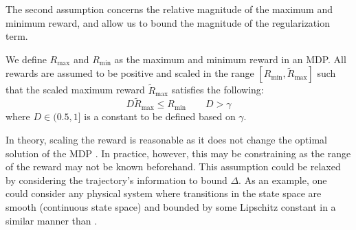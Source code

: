 The second assumption concerns the relative magnitude of the maximum and minimum reward, and allow us to bound the magnitude of the regularization term. 
\begin{assumption}
\label{assumption_rew}
We define $R_{\max}$ and $R_{\min}$ as the maximum and minimum reward in an MDP. All rewards are assumed to be positive and scaled in the range $[R_{\min},\widetilde{R}_{\max}]$ such that the scaled maximum reward $\widetilde{R}_{\max}$ satisfies the following:
\begin{equation}
    D\widetilde{R}_{\text{max}}  \leq R_{\text{min}} \qquad  D > \gamma 
\end{equation}
where $D \in (0.5,1]$ is a constant to be defined based on $\gamma$.
\end{assumption}
In theory, scaling the reward is reasonable as it does not change the optimal solution of the MDP \cite{van2016learning}. In practice, however, this may be constraining as the range of the reward may not be known beforehand. This assumption could be relaxed by considering the trajectory's information to bound $\Delta$. As an example, one could consider any physical system where transitions in the state space are smooth (continuous state space) and bounded by some Lipschitz constant in a similar manner than \cite{shah2018q}. 

